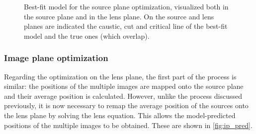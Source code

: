 \begin{figure}
  \begin{minipage}{\linewidth}
    \centering
  \end{minipage}
  \begin{minipage}{\linewidth}
    \centering
  \end{minipage}
  \caption[Best-fit model source and image plane]{Best-fit model for the source plane optimization, visualized both \protect{} in the source plane and \protect{} in the lens plane. On the source and lens planes are indicated the caustic, cut and critical line of the best-fit model and the true ones (which overlap).}
  \label{fig:sp_best}
\end{figure}

\subsubsection{Image plane optimization}
\label{subsubsec:image_plane_opt}

Regarding the optimization on the lens plane, the first part of the process is similar: the positions of the multiple images are mapped onto the source plane and their average position is calculated. However, unlike the process discussed previously, it is now necessary to remap the average position of the sources onto the lens plane by solving the lens equation. This allows the model-predicted positions of the multiple images to be obtained. These are shown in \cref{fig:ip_pred}.

